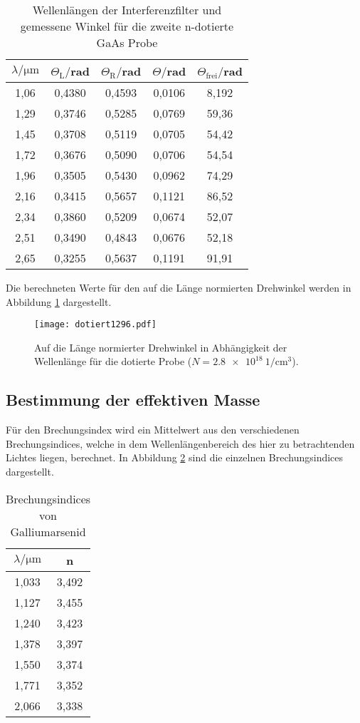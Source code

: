 \begin{table}[H]
  \centering
  \caption{Wellenlängen der Interferenzfilter und gemessene Winkel für die zweite n-dotierte GaAs Probe}
  \label{tab:zweite}
  \begin{tabular}{c c c c c}
    \toprule
    $\lambda/\mathrm{\mu m}$ & $\Theta_{\mathrm{L}}/$rad & $\Theta_{\mathrm{R}}/$rad  & $\Theta /$rad & $\Theta_{\mathrm{frei}}/$rad\\
    \midrule
    1,06  & 0,4380 & 0,4593 & 0,0106 & 8,192 \\
    1,29  & 0,3746 & 0,5285 & 0,0769 & 59,36 \\
    1,45  & 0,3708 & 0,5119 & 0,0705 & 54,42 \\
    1,72  & 0,3676 & 0,5090 & 0,0706 & 54,54 \\
    1,96  & 0,3505 & 0,5430 & 0,0962 & 74,29 \\
    2,16  & 0,3415 & 0,5657 & 0,1121 & 86,52 \\
    2,34  & 0,3860 & 0,5209 & 0,0674 & 52,07 \\
    2,51  & 0,3490 & 0,4843 & 0,0676 & 52,18 \\
    2,65  & 0,3255 & 0,5637 & 0,1191 & 91,91 \\
    \bottomrule
  \end{tabular}
\end{table}


Die berechneten Werte für den auf die Länge normierten Drehwinkel werden
in Abbildung \ref{fig:rein} dargestellt.
\begin{figure}[H]
  \centering
  \texttt{[image: dotiert1296.pdf]}
  \caption{Auf die Länge normierter Drehwinkel in Abhängigkeit der Wellenlänge für die dotierte Probe ($N = \SI{2.8e18}{1\per\centi\meter^3}$).}
  \label{fig:rein}
\end{figure}


\subsection{Bestimmung der effektiven Masse}
Für den Brechungsindex wird ein Mittelwert aus den verschiedenen Brechungsindices,
welche in dem Wellenlängenbereich des hier zu betrachtenden Lichtes liegen, berechnet. In Abbildung \ref{tab:Brechung}
sind die einzelnen Brechungsindices dargestellt.

\begin{table}[H]
  \centering
  \caption{Brechungsindices von Galliumarsenid \cite{sample3}}
  \label{tab:Brechung}
  \begin{tabular}{c c}
    \toprule
    $\lambda/\mathrm{\mu m}$ & n\\
    \midrule
    1,033  & 3,492 \\
    1,127  & 3,455 \\
    1,240  & 3,423 \\
    1,378  & 3,397 \\
    1,550  & 3,374 \\
    1,771  & 3,352 \\
    2,066  & 3,338 \\
    \bottomrule
  \end{tabular}
\end{table}

